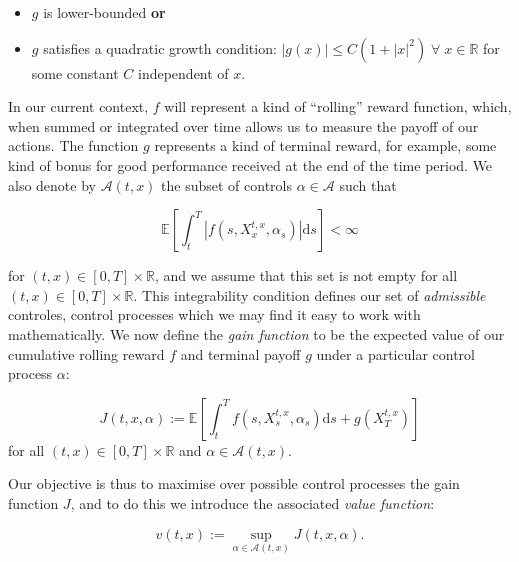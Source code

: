 \begin{itemize}
    \item $g$ is lower-bounded \textbf{or}
    \item $g$ satisfies a quadratic growth condition: $|g(x)|\leq C(1+|x|^2)\;\forall\;x\in\mathbb{R}$ for some constant $C$ independent of $x$.
\end{itemize}

In our current context, $f$ will represent a kind of ``rolling'' reward function, 
which, when summed or integrated over time allows us to measure the payoff of 
our actions. The function $g$ represents a kind of terminal reward, for example, 
some kind of bonus for good performance received at the end of the time period.
We also denote by $\mathcal{A}(t,x)$ the subset of controls $\alpha\in\mathcal{A}$ 
such that

\begin{equation*}
    \mathbb{E}\left[\int_t^T|f(s,X_x^{t,x},\alpha_s)|\mathrm ds\right]<\infty
\end{equation*}

for $(t,x)\in[0,T]\times\mathbb{R}$, and we assume that this set is not empty for all 
$(t,x)\in[0,T]\times\mathbb{R}$. This integrability condition defines our set of 
\emph{admissible} controles, control processes which we may find it easy to work 
with mathematically. We now define the \emph{gain function} to be the expected value
of our cumulative rolling reward $f$ and terminal payoff $g$ under a particular 
control process $\alpha$:

\begin{definition}
    \begin{equation}
        J(t,x,\alpha):=\mathbb{E}\left[\int_t^Tf(s,X_s^{t,x},\alpha_s)\mathrm ds+g(X_T^{t,x})\right]
    \end{equation}
    for all $(t,x)\in[0,T]\times\mathbb{R}$ and $\alpha\in\mathcal{A}(t,x).$
\end{definition}

Our objective is thus to maximise over possible control processes the gain function $J$,
and to do this we introduce the associated \emph{value function}:

\begin{definition}
    \begin{equation}\label{eq:2.6}
        v(t,x):=\sup_{\alpha\in\mathcal{A}(t,x)}J(t,x,\alpha).
    \end{equation}
\end{definition}

